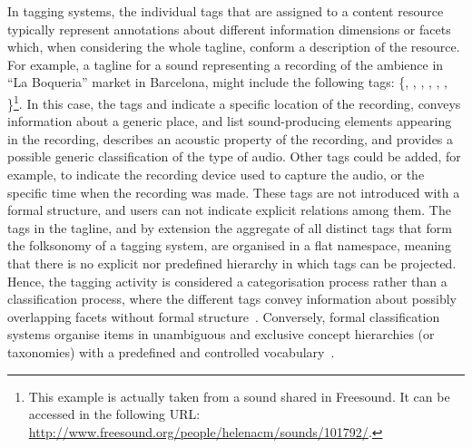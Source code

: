 In tagging systems, the individual tags that are assigned to a content resource typically represent annotations about different information dimensions or facets which, when considering the whole tagline, conform a description of the resource.
For example, a tagline for a sound representing a recording of the ambience in ``La Boqueria'' market in Barcelona, might include the following tags: \{, , , , , , \}\footnote{This example is actually taken from a sound shared in Freesound. It can be accessed in the following URL: \url{http://www.freesound.org/people/helenacm/sounds/101792/}.}.
In this case, the tags  and  indicate a specific location of the recording,  conveys information about a generic place,  and  list sound-producing elements appearing in the recording,  describes an acoustic property of the recording, and  provides a possible generic classification of the type of audio. Other tags could be added, for example, to indicate the recording device used to capture the audio, or the specific time when the recording was made.
These tags are not introduced with a formal structure, and users can not indicate explicit relations among them.
The tags in the tagline, and by extension the aggregate of all distinct tags that form the folksonomy of a tagging system, are organised in a flat namespace, meaning that there is no explicit nor predefined hierarchy in which tags can be projected. 
Hence, the tagging activity is considered a categorisation process rather than a classification process, where the different tags convey information about possibly overlapping facets without formal structure~\citep{Jacob2004,halpin2006}. Conversely, formal classification systems organise items in unambiguous and exclusive concept hierarchies (or taxonomies) with a predefined and controlled vocabulary~\citep{golder2006}. %
